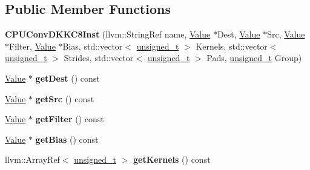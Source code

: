 \subsection*{Public Member Functions}
\begin{DoxyCompactItemize}
\item 
\mbox{\label{classglow_1_1_c_p_u_conv_d_k_k_c8_inst_a81d6f47bca4e3c74edb1d92fac2657a4}} 
{\bfseries C\+P\+U\+Conv\+D\+K\+K\+C8\+Inst} (llvm\+::\+String\+Ref name, \hyperlink{classglow_1_1_value}{Value} $\ast$Dest, \hyperlink{classglow_1_1_value}{Value} $\ast$Src, \hyperlink{classglow_1_1_value}{Value} $\ast$Filter, \hyperlink{classglow_1_1_value}{Value} $\ast$Bias, std\+::vector$<$ \hyperlink{namespaceglow_a0ca574644e1e42ef193a9947fb4d8911}{unsigned\+\_\+t} $>$ Kernels, std\+::vector$<$ \hyperlink{namespaceglow_a0ca574644e1e42ef193a9947fb4d8911}{unsigned\+\_\+t} $>$ Strides, std\+::vector$<$ \hyperlink{namespaceglow_a0ca574644e1e42ef193a9947fb4d8911}{unsigned\+\_\+t} $>$ Pads, \hyperlink{namespaceglow_a0ca574644e1e42ef193a9947fb4d8911}{unsigned\+\_\+t} Group)
\item 
\mbox{\label{classglow_1_1_c_p_u_conv_d_k_k_c8_inst_a2b29cbc43ab30d6ae93beba87694acae}} 
\hyperlink{classglow_1_1_value}{Value} $\ast$ {\bfseries get\+Dest} () const
\item 
\mbox{\label{classglow_1_1_c_p_u_conv_d_k_k_c8_inst_a78bcf73a39ce28176fe3c8f27412dfc4}} 
\hyperlink{classglow_1_1_value}{Value} $\ast$ {\bfseries get\+Src} () const
\item 
\mbox{\label{classglow_1_1_c_p_u_conv_d_k_k_c8_inst_a109de8ffabce0cbde3953640b52c77f6}} 
\hyperlink{classglow_1_1_value}{Value} $\ast$ {\bfseries get\+Filter} () const
\item 
\mbox{\label{classglow_1_1_c_p_u_conv_d_k_k_c8_inst_a3d68369b94f2e3dd56c003905b9a6e23}} 
\hyperlink{classglow_1_1_value}{Value} $\ast$ {\bfseries get\+Bias} () const
\item 
\mbox{\label{classglow_1_1_c_p_u_conv_d_k_k_c8_inst_a39582452831e09fca03850251d1a44aa}} 
llvm\+::\+Array\+Ref$<$ \hyperlink{namespaceglow_a0ca574644e1e42ef193a9947fb4d8911}{unsigned\+\_\+t} $>$ {\bfseries get\+Kernels} () const

\end{DoxyCompactItemize}
